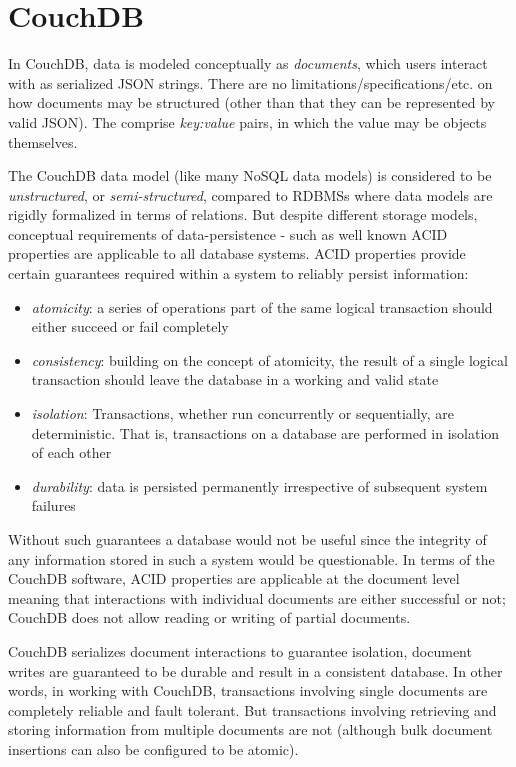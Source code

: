\section{CouchDB}
In CouchDB, data is modeled conceptually as \textit{documents}, which users interact with as serialized JSON strings. There are no limitations/specifications/etc. on how documents may be structured (other than that they can be represented by valid JSON). The comprise \textit{key:value} pairs, in which the value may be objects themselves.

The CouchDB data model (like many NoSQL data models) is considered to be \textit{unstructured}, or \textit{semi-structured}, compared to RDBMSs where data models are rigidly formalized in terms of relations. But despite different storage models, conceptual requirements of data-persistence - such as well known ACID properties are applicable to all database systems. ACID properties provide certain guarantees required within a system to reliably persist information:

\begin{itemize}
    \item \textit{atomicity}: a series of operations part of the same logical transaction should either succeed or fail completely
    \item \textit{consistency}: building on the concept of atomicity, the result of a single logical transaction should leave the database in a working and valid state
    \item \textit{isolation}: Transactions, whether run concurrently or sequentially, are deterministic. That is, transactions on a database are performed in isolation of each other
    \item \textit{durability}: data is persisted permanently irrespective of subsequent system failures
\end{itemize}

Without such guarantees a database would not be useful since the integrity of any information stored in such a system would be questionable. In terms of the CouchDB software, ACID properties are applicable at the document level meaning that interactions with individual documents are either successful or not; CouchDB does not allow reading or writing of partial documents.

CouchDB serializes document interactions to guarantee isolation, document writes are guaranteed to be durable and result in a consistent database. In other words, in working with CouchDB, transactions involving single documents are completely reliable and fault tolerant. But transactions involving retrieving and storing information from multiple documents are not (although bulk document insertions can also be configured to be atomic).

